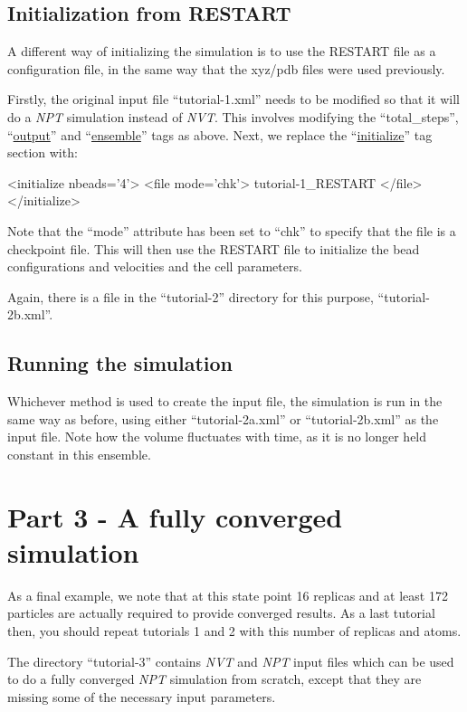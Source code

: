 \documentclass[11pt,english,fleqn]{report}
\newenvironment{code}{%
\footnotesize 
\verbatim
}{
\endverbatim
\normalsize
}
\begin{document}
\subsection{Initialization from RESTART}

A different way of initializing the simulation is to use the 
RESTART file as a configuration file, in the same way that
the xyz/pdb files were used previously.

Firstly, the original input file {}``tutorial-1.xml'' needs to
be modified so that
it will do a \emph{NPT} simulation instead of \emph{NVT}. This involves modifying
the {}``total\_steps'', {}``\hyperref[OUTPUTS]{output}'' and 
{}``\hyperref[ENSEMBLE]{ensemble}'' tags as above. Next, we replace the 
{}``\hyperref[INITIALIZER]{initialize}'' tag section with:

\begin{code}
<initialize nbeads='4'>
   <file mode='chk'> tutorial-1_RESTART </file>
</initialize>
\end{code}

Note that the {}``mode'' attribute has been set to {}``chk''
to specify that the file is a checkpoint file.
This will then use the RESTART file to initialize the bead
configurations and velocities and the cell parameters.

Again, there is a file in the {}``tutorial-2'' directory
for this purpose, {}``tutorial-2b.xml''.

\subsection{Running the simulation}

Whichever method is used to create the input file, the simulation
is run in the same way as before, using either
{}``tutorial-2a.xml'' or {}``tutorial-2b.xml'' as the input file. 
Note how the volume fluctuates with time, as it is no longer held
constant in this ensemble.

\section{Part 3 - A fully converged simulation}

As a final example, we note that at this state point 16 replicas
and at least 172 particles are actually 
required to provide converged results.
As a last tutorial then, you should repeat tutorials 1 and 2 with
this number of replicas and atoms. 

The directory {}``tutorial-3'' contains 
\emph{NVT} and \emph{NPT} input files which can be used to do a fully converged
\emph{NPT} simulation from scratch, except that they are missing some
of the necessary input parameters.
\end{document}
